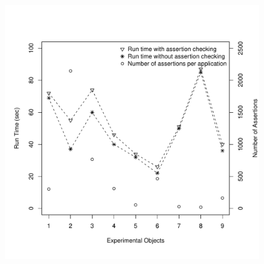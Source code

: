 \begin{figure}[t]
\centering
\includegraphics[width=0.68\hsize]{rscripts/overhead}
\label{Fig:overhead}
\end{figure}

  
  






